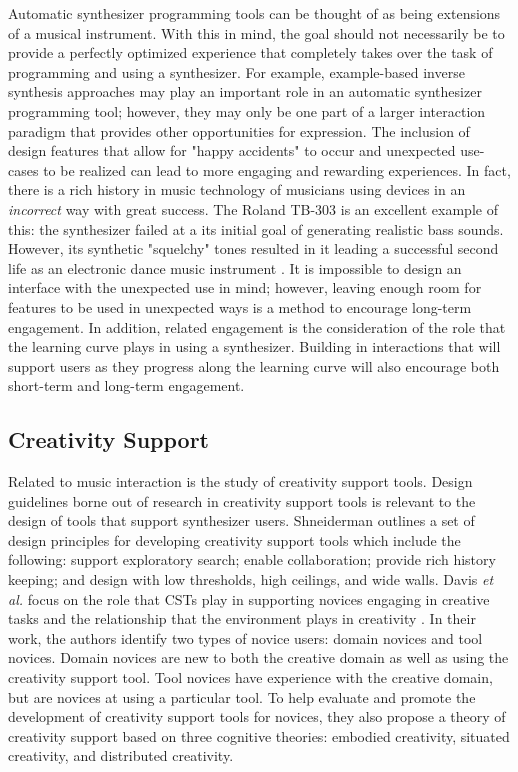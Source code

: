 Automatic synthesizer programming tools can be thought of as being extensions of a musical instrument. With this in mind, the goal should not necessarily be to provide a perfectly optimized experience that completely takes over the task of programming and using a synthesizer. For example, example-based inverse synthesis approaches may play an important role in an automatic synthesizer programming tool; however, they may only be one part of a larger interaction paradigm that provides other opportunities for expression. The inclusion of design features that allow for "happy accidents" to occur and unexpected use-cases to be realized can lead to more engaging and rewarding experiences. In fact, there is a rich history in music technology of musicians using devices in an \textit{incorrect} way with great success. The Roland TB-303 is an excellent example of this: the synthesizer failed at a its initial goal of generating realistic bass sounds. However, its synthetic "squelchy" tones resulted in it leading a successful second life as an electronic dance music instrument \cite{vine2011tb303}. It is impossible to design an interface with the unexpected use in mind; however, leaving enough room for features to be used in unexpected ways is a method to encourage long-term engagement. In addition, related engagement is the consideration of the role that the learning curve plays in using a synthesizer. Building in interactions that will support users as they progress along the learning curve will also encourage both short-term and long-term engagement.

\subsection{Creativity Support}
Related to music interaction is the study of creativity support tools. Design guidelines borne out of research in creativity support tools is relevant to the design of tools that support synthesizer users. Shneiderman \cite{shneiderman2007creativity} outlines a set of design principles for developing creativity support tools which include the following: support exploratory search; enable collaboration; provide rich history keeping; and design with low thresholds, high ceilings, and wide walls. Davis \textit{et al.} focus on the role that CSTs play in supporting novices engaging in creative tasks and the relationship that the environment plays in creativity \cite{davis2013toward}. In their work, the authors identify two types of novice users: domain novices and tool novices. Domain novices are new to both the creative domain as well as using the creativity support tool. Tool novices have experience with the creative domain, but are novices at using a particular tool. To help evaluate and promote the development of creativity support tools for novices, they also propose a theory of creativity support based on three cognitive theories: embodied creativity, situated creativity, and distributed creativity.

